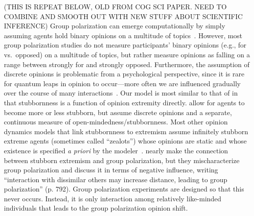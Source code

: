 (THIS IS REPEAT BELOW, OLD FROM COG SCI PAPER. NEED TO COMBINE AND SMOOTH OUT 
WITH NEW STUFF ABOUT SCIENTIFIC INFERENCE)
Group polarization can emerge computationally by simply 
assuming agents hold binary opinions on a multitude of topics~\cite{Mueller2018,Banisch2019}. 
However, most group polarization studies do not measure participants' binary opinions (e.g., for vs.\ opposed) on a multitude of topics, but rather measure opinions as falling on a range between strongly for and strongly opposed. Furthermore, the assumption of discrete opinions is problematic from a psychological perspective,
since it is rare for quantum leaps in opinion to occur---more often we are
influenced gradually over the course of many interactions~\cite[p.793]{Baldassarri2007}.
Our model is most similar to that of  in that stubbornness is 
a function of opinion extremity directly.  allow for agents
to become more or less stubborn, but assume discrete opinions and a separate,
continuous measure of open-mindedness/stubbornness.
Most other opinion dynamics models that link 
stubbornness to extremism assume infinitely stubborn
extreme agents (sometimes called ``zealots'') whose opinions are static and whose existence is specified
\emph{a priori} by the modeler~\cite{Galam2007,Mobilia2007,Arendt2015,Mueller2018}.
 nearly make the connection between stubborn extremism
and group polarization, but they mischaracterize group polarization and discuss it in terms of negative influence, writing
``interaction with dissimilar others may increase distance, leading to group
polarization'' (p. 792). Group polarization experiments are designed so that
this never occurs. Instead, it is only interaction among relatively like-minded
individuals that leads to the group polarization opinion shift.


